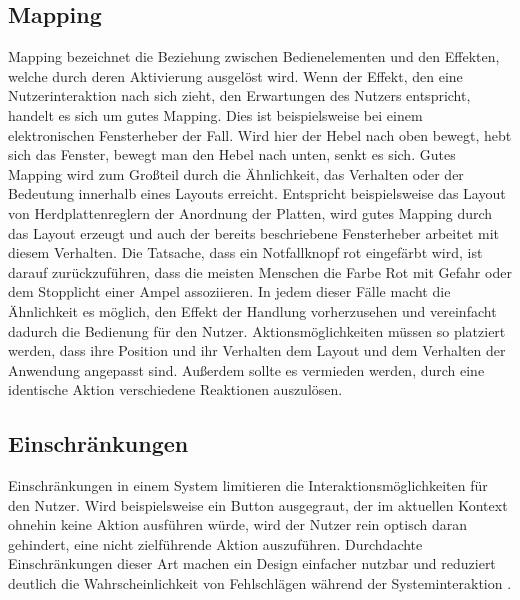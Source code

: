\subsection*{Mapping}
Mapping bezeichnet die Beziehung zwischen Bedienelementen und den Effekten, welche durch deren Aktivierung ausgelöst wird.
Wenn der Effekt, den eine Nutzerinteraktion nach sich zieht, den Erwartungen des Nutzers entspricht, handelt es sich um gutes Mapping.
Dies ist beispielsweise bei einem elektronischen Fensterheber der Fall. Wird hier der Hebel nach oben bewegt, hebt sich das Fenster, bewegt man den Hebel nach unten, senkt es sich.
Gutes Mapping wird zum Großteil durch die Ähnlichkeit, das Verhalten oder der Bedeutung innerhalb eines Layouts erreicht.
Entspricht beispielsweise das Layout von Herdplattenreglern der Anordnung der Platten, wird gutes Mapping durch das Layout erzeugt und auch der bereits beschriebene Fensterheber arbeitet mit diesem Verhalten.
Die Tatsache, dass ein Notfallknopf rot eingefärbt wird, ist darauf zurückzuführen, dass die meisten Menschen die Farbe Rot mit Gefahr oder dem Stopplicht einer Ampel assoziieren.
In jedem dieser Fälle macht die Ähnlichkeit es möglich, den Effekt der Handlung vorherzusehen und vereinfacht dadurch die Bedienung für den Nutzer.
Aktionsmöglichkeiten müssen so platziert werden, dass ihre Position und ihr Verhalten dem Layout und dem Verhalten der Anwendung angepasst sind. 
Außerdem sollte es vermieden werden, durch eine identische Aktion verschiedene Reaktionen auszulösen\cite{Lidwell.2010}.

\subsection*{Einschränkungen}
Einschränkungen in einem System limitieren die Interaktionsmöglichkeiten für den Nutzer.
Wird beispielsweise ein Button ausgegraut, der im aktuellen Kontext ohnehin keine Aktion ausführen würde, wird der Nutzer rein optisch daran gehindert, eine nicht zielführende Aktion auszuführen.
Durchdachte Einschränkungen dieser Art machen ein Design einfacher nutzbar und reduziert deutlich die Wahrscheinlichkeit von Fehlschlägen während der Systeminteraktion \cite{Lidwell.2010}.

